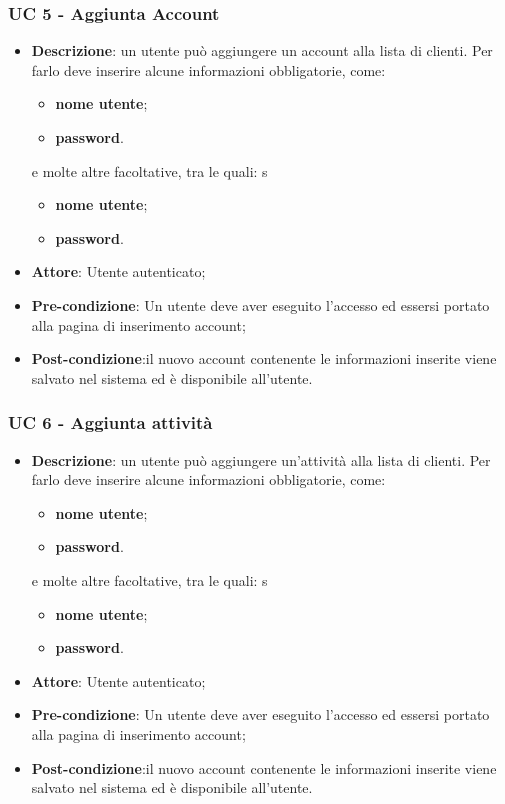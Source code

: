 \subsubsection{UC 5 - Aggiunta Account}

\begin{itemize}
	\item \textbf{Descrizione}: un utente può aggiungere un account alla lista di clienti. Per farlo deve inserire alcune informazioni obbligatorie, come:
	\begin{itemize}
		\item \textbf{nome utente};
		\item \textbf{password}.
	\end{itemize}
	e molte altre facoltative, tra le quali:
	s\begin{itemize}
		\item \textbf{nome utente};
		\item \textbf{password}.
	\end{itemize}
	\item \textbf{Attore}: Utente autenticato;
	\item \textbf{Pre-condizione}: Un utente deve aver eseguito l'accesso ed essersi portato alla pagina di inserimento account;
	\item \textbf{Post-condizione}:il nuovo account contenente le informazioni inserite viene salvato nel sistema ed è disponibile all'utente.
\end{itemize}

\subsubsection{UC 6 - Aggiunta attività}

\begin{itemize}
	\item \textbf{Descrizione}: un utente può aggiungere un'attività alla lista di clienti. Per farlo deve inserire alcune informazioni obbligatorie, come:
	\begin{itemize}
		\item \textbf{nome utente};
		\item \textbf{password}.
	\end{itemize}
	e molte altre facoltative, tra le quali:
	s\begin{itemize}
		\item \textbf{nome utente};
		\item \textbf{password}.
	\end{itemize}
	\item \textbf{Attore}: Utente autenticato;
	\item \textbf{Pre-condizione}: Un utente deve aver eseguito l'accesso ed essersi portato alla pagina di inserimento account;
	\item \textbf{Post-condizione}:il nuovo account contenente le informazioni inserite viene salvato nel sistema ed è disponibile all'utente.
\end{itemize}

